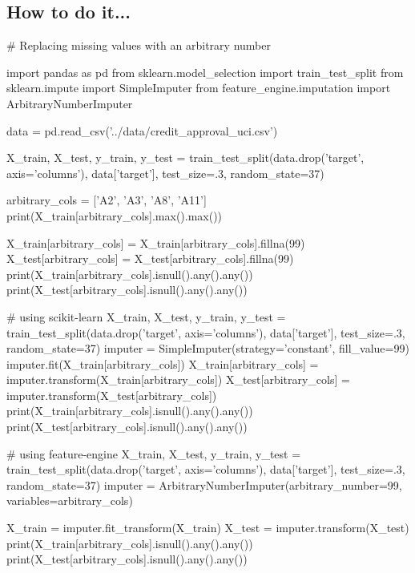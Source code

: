 
\subsection{How to do it...}
\begin{pyc}
# Replacing missing values with an arbitrary number

import pandas as pd
from sklearn.model_selection import train_test_split
from sklearn.impute import SimpleImputer
from feature_engine.imputation import ArbitraryNumberImputer

data = pd.read_csv('../data/credit_approval_uci.csv')

X_train, X_test, y_train, y_test = train_test_split(data.drop('target', axis='columns'),
                                                    data['target'],
                                                    test_size=.3,
                                                    random_state=37)

arbitrary_cols = ['A2', 'A3', 'A8', 'A11']
print(X_train[arbitrary_cols].max().max())

X_train[arbitrary_cols] = X_train[arbitrary_cols].fillna(99)
X_test[arbitrary_cols] = X_test[arbitrary_cols].fillna(99)
print(X_train[arbitrary_cols].isnull().any().any())
print(X_test[arbitrary_cols].isnull().any().any())

# using scikit-learn
X_train, X_test, y_train, y_test = train_test_split(data.drop('target', axis='columns'),
                                                    data['target'],
                                                    test_size=.3,
                                                    random_state=37)
imputer = SimpleImputer(strategy='constant', fill_value=99)
imputer.fit(X_train[arbitrary_cols])
X_train[arbitrary_cols] = imputer.transform(X_train[arbitrary_cols])
X_test[arbitrary_cols] = imputer.transform(X_test[arbitrary_cols])
print(X_train[arbitrary_cols].isnull().any().any())
print(X_test[arbitrary_cols].isnull().any().any())


# using feature-engine
X_train, X_test, y_train, y_test = train_test_split(data.drop('target', axis='columns'),
                                                    data['target'],
                                                    test_size=.3,
                                                    random_state=37)
imputer = ArbitraryNumberImputer(arbitrary_number=99, variables=arbitrary_cols)

X_train = imputer.fit_transform(X_train)
X_test = imputer.transform(X_test)
print(X_train[arbitrary_cols].isnull().any().any())
print(X_test[arbitrary_cols].isnull().any().any())
\end{pyc}

